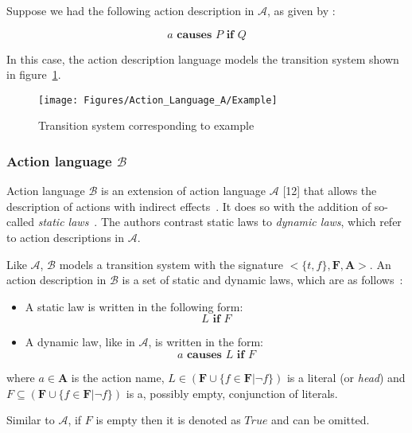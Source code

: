 Suppose we had the following action description in $\mathcal{A}$, as given by \citet{gelfond_action_1998}:

$$
a \textbf{ causes } P \textbf{ if } Q
$$

In this case, the action description language models the transition system shown in figure~\ref{fig:action_language_a_example}.

\begin{figure}[h]
    \centering
    \texttt{[image: Figures/Action\_Language\_A/Example]}
    \caption{Transition system corresponding to example}
    \label{fig:action_language_a_example}
\end{figure}

\subsubsection{Action language $ \mathcal{B} $}
\label{subsubsec:action_language_b}

Action language $ \mathcal{B} $ is an extension of action language $ \mathcal{A} $ [12] that allows the description of actions with indirect effects~\citep{gelfond_action_1998}.
It does so with the addition of so-called \textit{static laws}~\citep{gelfond_action_1998}.
The authors contrast static laws to \textit{dynamic laws}, which refer to action descriptions in $\mathcal{A}$.

Like $\mathcal{A}$, $\mathcal{B}$ models a transition system with the signature $<\{t, f\},\boldsymbol{F},\boldsymbol{A}>$.
An action description in $\mathcal{B}$ is a set of static and dynamic laws, which are as follows~\citep{gelfond_action_1998}:

\begin{itemize}
    \item A static law is written in the following form:
        $$
        L \textbf{ if } F
        $$

    \item A dynamic law, like in $\mathcal{A}$, is written in the form:
        $$
        a \textbf{ causes } L \textbf{ if } F
        $$
\end{itemize}

\noindent
where $a \in \boldsymbol{A}$ is the action name, $L \in(\boldsymbol{F} \cup\{f \in \boldsymbol{F}| \neg f\})$ is a literal (or \textit{head}) and $F \subseteq(\boldsymbol{F} \cup\{f \in \boldsymbol{F}| \neg f\})$ is a, possibly empty, conjunction of literals.

Similar to $\mathcal{A}$, if $F$ is empty then it is denoted as $True$ and can be omitted.

